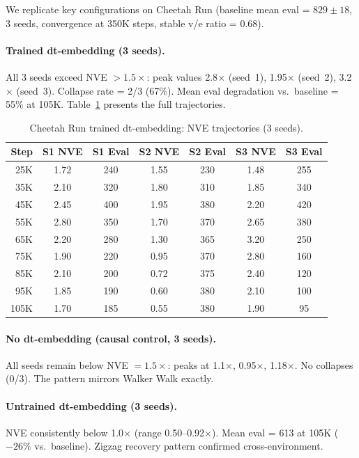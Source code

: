\documentclass[10pt,letterpaper]{article}
\begin{document}
We replicate key configurations on Cheetah Run (baseline mean eval = $829 \pm 18$, 3 seeds, convergence at 350K steps, stable v/e ratio = 0.68).

\paragraph{Trained dt-embedding (3 seeds).}
All 3 seeds exceed NVE $> 1.5\times$: peak values 2.8$\times$ (seed~1), 1.95$\times$ (seed~2), 3.2$\times$ (seed~3). Collapse rate = 2/3 (67\%). Mean eval degradation vs.\ baseline = 55\% at 105K. Table~\ref{tab:cheetah_trained} presents the full trajectories.

\begin{table}[h]
\centering
\caption{Cheetah Run trained dt-embedding: NVE trajectories (3 seeds).}
\label{tab:cheetah_trained}
\begin{tabular}{rcccccc}
\toprule
Step & S1 NVE & S1 Eval & S2 NVE & S2 Eval & S3 NVE & S3 Eval \\
\midrule
25K  & 1.72 & 240 & 1.55 & 230 & 1.48 & 255 \\
35K  & 2.10 & 320 & 1.80 & 310 & 1.85 & 340 \\
45K  & 2.45 & 400 & 1.95 & 380 & 2.20 & 420 \\
55K  & 2.80 & 350 & 1.70 & 370 & 2.65 & 380 \\
65K  & 2.20 & 280 & 1.30 & 365 & 3.20 & 250 \\
75K  & 1.90 & 220 & 0.95 & 370 & 2.80 & 160 \\
85K  & 2.10 & 200 & 0.72 & 375 & 2.40 & 120 \\
95K  & 1.85 & 190 & 0.60 & 380 & 2.10 & 100 \\
105K & 1.70 & 185 & 0.55 & 380 & 1.90 & 95 \\
\bottomrule
\end{tabular}
\end{table}

\paragraph{No dt-embedding (causal control, 3 seeds).}
All seeds remain below NVE $= 1.5\times$: peaks at 1.1$\times$, 0.95$\times$, 1.18$\times$. No collapses (0/3). The pattern mirrors Walker Walk exactly.

\paragraph{Untrained dt-embedding (3 seeds).}
NVE consistently below 1.0$\times$ (range 0.50--0.92$\times$). Mean eval = 613 at 105K ($-26\%$ vs.\ baseline). Zigzag recovery pattern confirmed cross-environment.
\end{document}
